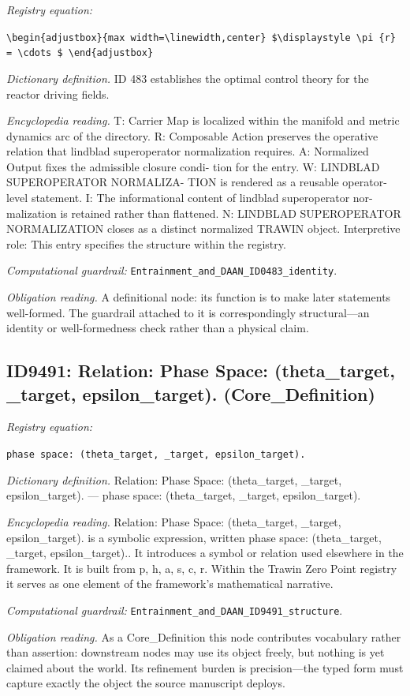 \documentclass[11pt]{article}
\theoremstyle{remark}
\begin{document}
\noindent\textit{Registry equation:}\par
{\small\texttt{\textbackslash{}begin\{adjustbox\}\{max width=\textbackslash{}linewidth,center\} \$\textbackslash{}displaystyle \textbackslash{}pi \{r\} = \textbackslash{}cdots \$ \textbackslash{}end\{adjustbox\}}}\par\medskip
\noindent\textit{Dictionary definition.} ID 483 establishes the optimal control theory for the reactor driving fields.\par\medskip
\noindent\textit{Encyclopedia reading.} T: Carrier Map is localized within the manifold and metric dynamics arc of the directory. R: Composable Action preserves the operative relation that lindblad superoperator normalization requires. A: Normalized Output fixes the admissible closure condi- tion for the entry. W: LINDBLAD SUPEROPERATOR NORMALIZA- TION is rendered as a reusable operator-level statement. I: The informational content of lindblad superoperator nor- malization is retained rather than flattened. N: LINDBLAD SUPEROPERATOR NORMALIZATION closes as a distinct normalized TRAWIN object. Interpretive role: This entry specifies the structure within the registry.
\par\medskip\noindent\textit{Computational guardrail:} \texttt{Entrainment\_and\_DAAN\_ID0483\_identity}.
\par\medskip\noindent\textit{Obligation reading.} A definitional node: its function is to make later statements well-formed. The guardrail attached to it is correspondingly structural---an identity or well-formedness check rather than a physical claim.

\subsection{ID9491: Relation: Phase Space: (theta\_target, \_target, epsilon\_target). (Core\_Definition)}

\noindent\textit{Registry equation:}\par
{\small\texttt{phase space: (theta\_target, \_target, epsilon\_target).}}\par\medskip
\noindent\textit{Dictionary definition.} Relation: Phase Space: (theta\_target, \_target, epsilon\_target). --- phase space: (theta\_target, \_target, epsilon\_target).\par\medskip
\noindent\textit{Encyclopedia reading.} Relation: Phase Space: (theta\_target, \_target, epsilon\_target). is a symbolic expression, written phase space: (theta\_target, \_target, epsilon\_target).. It introduces a symbol or relation used elsewhere in the framework. It is built from p, h, a, s, c, r. Within the Trawin Zero Point registry it serves as one element of the framework's mathematical narrative.
\par\medskip\noindent\textit{Computational guardrail:} \texttt{Entrainment\_and\_DAAN\_ID9491\_structure}.
\par\medskip\noindent\textit{Obligation reading.} As a Core\_Definition this node contributes vocabulary rather than assertion: downstream nodes may use its object freely, but nothing is yet claimed about the world. Its refinement burden is precision---the typed form must capture exactly the object the source manuscript deploys.
\end{document}
